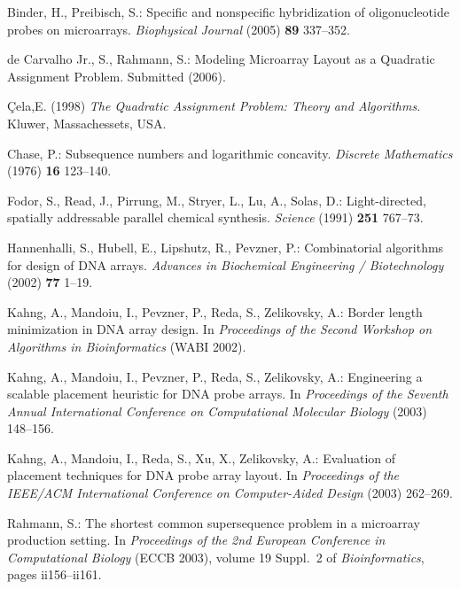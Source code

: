 \documentclass{llncs}
\newcommand{\ignore}[1]{}
\begin{document}
\begin{thebibliography}{5}

Binder, H., Preibisch, S.:
Specific and nonspecific hybridization of oligonucleotide probes on microarrays.
{\it Biophysical Journal} (2005) {\bf 89} 337--352.

de Carvalho Jr., S., Rahmann, S.:
Modeling Microarray Layout as a Quadratic Assignment Problem.
Submitted (2006).

 \c{C}ela,E. (1998) {\it The Quadratic Assignment Problem: Theory and Algorithms}. Kluwer, Massachessets, USA.


Chase, P.:
Subsequence numbers and logarithmic concavity.
{\it Discrete Mathematics} (1976) {\bf 16} 123--140.

\ignore{
\bibitem{FELDMAN93}
Feldman, W., Pevzner, P.:
Gray code masks for sequencing by hybridization.
{\it Genomics} (1994) {\bf 23} 233--235.
}

Fodor, S., Read, J., Pirrung, M., Stryer, L., Lu, A., Solas, D.:
Light-directed, spatially addressable parallel chemical synthesis.
{\it Science} (1991) {\bf 251} 767--73.

Hannenhalli, S., Hubell, E., Lipshutz, R., Pevzner, P.:
Combinatorial algorithms for design of DNA arrays.
{\it Advances in Biochemical Engineering / Biotechnology} (2002) {\bf 77} 1--19.

Kahng, A., Mandoiu, I., Pevzner, P., Reda, S., Zelikovsky, A.:
Border length minimization in DNA array design.
In {\it Proceedings of the Second Workshop on Algorithms in Bioinformatics} (WABI 2002).

Kahng, A., Mandoiu, I., Pevzner, P., Reda, S., Zelikovsky, A.:
Engineering a scalable placement heuristic for DNA probe arrays.
In {\it Proceedings of the Seventh Annual International Conference on Computational
Molecular Biology} (2003) 148--156.

Kahng, A., Mandoiu, I., Reda, S., Xu, X., Zelikovsky, A.:
Evaluation of placement techniques for DNA probe array layout.
In {\it Proceedings of the IEEE/ACM International Conference on Computer-Aided Design}
(2003) 262--269.

Rahmann, S.:
The shortest common supersequence problem in a microarray production setting.
In {\it Proceedings of the 2nd European Conference in Computational Biology}
({ECCB} 2003), volume 19 Suppl.~2 of {\it Bioinformatics}, pages ii156--ii161.

\end{thebibliography}
\end{document}
